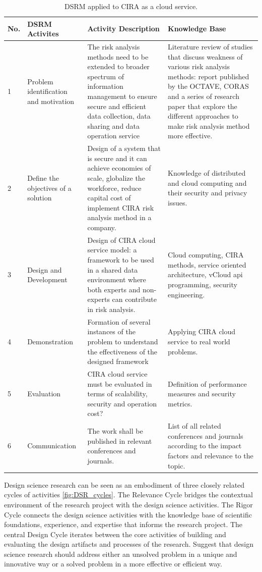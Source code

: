 \documentclass[a4paper,twoside,10pt]{report}
\begin{document}
\begin{table}[h]
	\centering
		\begin{tabular}{|p{0.4cm}|p{3cm}|p{5cm}|p{5cm}|}\hline
		
		\textbf{No.} & \textbf{DSRM Activites} & \textbf{Activity Description} & \textbf{Knowledge Base} \\ 
	\hline			
				1 & Problem identification and motivation & The risk analysis methods need to be extended to broader spectrum of information management to ensure secure and efficient data collection, data sharing and data operation service & Literature review of studies that discuss weakness of various risk analysis methods: report published by the OCTAVE, CORAS and a series of research paper that explore the different approaches to make risk analysis method more effective. \\ \hline
				2 & Define the objectives of a solution & Design of a system that is secure and it can achieve economies of scale, globalize the workforce, reduce capital cost of implement CIRA risk analysis method in a company. & Knowledge of distributed and cloud computing and their security and privacy issues. \\  \hline
				3 & Design and Development & Design of CIRA cloud service model: a framework to be used in a shared data environment where both experts and non-experts can contribute in risk analysis. & Cloud computing, CIRA methods, service oriented architecture, vCloud api programming, security engineering. \\ \hline
				4 & Demonstration & Formation of several instances of the problem to understand the effectiveness of the designed framework & Applying CIRA cloud service to real world problems. \\ \hline
				5 & Evaluation & CIRA cloud service must be evaluated in terms of scalability, security and operation cost? & Definition of performance measures and security metrics. \\ \hline				
				6 & Communication & The work shall be published in relevant conferences and journals. & List of all related conferences and journals according to the impact factors and relevance to the topic. \\ \hline
				\hline
				
		\end{tabular}
	\caption{DSRM applied to CIRA as a cloud service.}
	\label{tab:DSRMCIRA}
\end{table}

Design science research can be seen as an embodiment of three closely related cycles of activities \ref{fig:DSR_cycles}. The Relevance Cycle bridges the contextual environment of the research project with the design science activities. The Rigor Cycle connects the design science activities with the knowledge base of scientific foundations, experience, and expertise that informs the research project. The central Design Cycle iterates between the core activities of building and evaluating the design artifacts and processes of the research. \cite{Hevner:2004:DSI:2017212.2017217} Suggest that design science research should address either an unsolved problem in a unique and innovative way or a solved problem in a more effective or efficient way.
\end{document}
